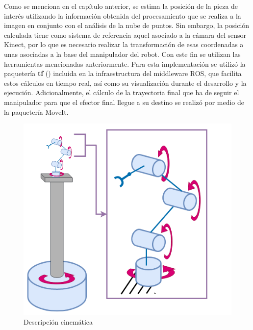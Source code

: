 Como se menciona en el capítulo anterior, se estima la posición de la pieza de interés utilizando la información obtenida del procesamiento que se realiza a la imagen en conjunto con el análisis de la nube de puntos. Sin embargo, la posición calculada tiene como sistema de referencia aquel asociado a la cámara del sensor Kinect, por lo que es necesario realizar la transformación de esas coordenadas a unas asociadas a la base del manipulador del robot. Con este fin se utilizan las herramientas mencionadas anteriormente. Para esta implementación se utilizó la paquetería \textbf{tf} (\cite*{tf_ROS}) incluida en la infraestructura del middleware ROS, que facilita estos cálculos en tiempo real, así como su visualización durante el desarrollo y la ejecución. Adicionalmente, el cálculo de la trayectoria final que ha de seguir el manipulador para que el efector final llegue a su destino se realizó por medio de la paquetería MoveIt.

\begin{figure}[H]
    \centering
    \includegraphics[scale=0.3]{Figures/Robotino_DescCin.png}
        \caption{Descripción cinemática}
        \label{fig:RobotinoDescCin}
\end{figure}